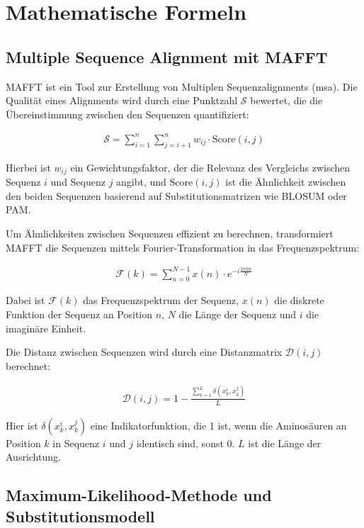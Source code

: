\chapter{Mathematische Formeln} \label{chap:mathematische-formeln}

\section{Multiple Sequence Alignment mit MAFFT}

MAFFT ist ein Tool zur Erstellung von Multiplen Sequenzalignments (\gls{msa}). Die Qualität eines Alignments wird durch eine Punktzahl $\mathcal{S}$ bewertet, die die Übereinstimmung zwischen den Sequenzen quantifiziert:

\begin{align}
    \mathcal{S} = \sum_{i=1}^n \sum_{j=i+1}^n w_{ij} \cdot \text{Score}(i, j)
\end{align}

Hierbei ist $w_{ij}$ ein Gewichtungsfaktor, der die Relevanz des Vergleichs zwischen Sequenz $i$ und Sequenz $j$ angibt, und $\text{Score}(i, j)$ ist die Ähnlichkeit zwischen den beiden Sequenzen basierend auf Substitutionsmatrizen wie BLOSUM oder PAM.

Um Ähnlichkeiten zwischen Sequenzen effizient zu berechnen, transformiert MAFFT die Sequenzen mittels Fourier-Transformation in das Frequenzspektrum:

\begin{align}
    \mathcal{F}(k) = \sum_{n=0}^{N-1} x(n) \cdot e^{-i \frac{2\pi k n}{N}}
\end{align}

Dabei ist $\mathcal{F}(k)$ das Frequenzspektrum der Sequenz, $x(n)$ die diskrete Funktion der Sequenz an Position $n$, $N$ die Länge der Sequenz und $i$ die imaginäre Einheit.

Die Distanz zwischen Sequenzen wird durch eine Distanzmatrix $\mathcal{D}(i, j)$ berechnet:

\begin{align}
    \mathcal{D}(i, j) = 1 - \frac{\sum_{k=1}^L \delta(x_k^i, x_k^j)}{L}
\end{align}

Hier ist $\delta(x_k^i, x_k^j)$ eine Indikatorfunktion, die 1 ist, wenn die Aminosäuren an Position $k$ in Sequenz $i$ und $j$ identisch sind, sonst 0. $L$ ist die Länge der Ausrichtung.

\section{Maximum-Likelihood-Methode und Substitutionsmodell}

